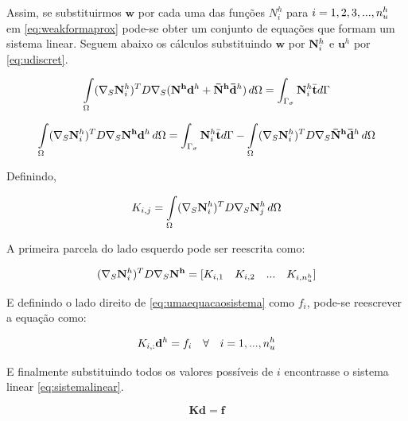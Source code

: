 Assim, se substituirmos $\mathbf{w}$ por cada uma das funções $N_i^h$ para $i = 1, 2, 3, ..., \freedomfine$ em \eqref{eq:weakformaprox} pode-se obter um conjunto de equações que formam um sistema linear. Seguem abaixo os cálculos substituindo $\mathbf{w}$ por $\basefunctionfine$ e $\mathbf{u}^h$ por \eqref{eq:udiscret}.


\begin{equation}
\omeint{ (\sopnabla \basefunctionfine)^T D \sopnabla (\mathbf{N^h} \mathbf{d}^h + \mathbf{\bar{N}^h} \mathbf{\bar{d}}^h )} = \int_{\Gamma_\sigma} \basefunctionfine \bar{\mathbf{t}} d\Gamma 
\end{equation}

\begin{equation}\label{eq:umaequacaosistema}
\omeint{ (\sopnabla \basefunctionfine)^T D \sopnabla \mathbf{N^h} \mathbf{d}^h }  = \int_{\Gamma_\sigma} \basefunctionfine \bar{\mathbf{t}}  d\Gamma - \omeint{ (\sopnabla \basefunctionfine)^T D \sopnabla  \mathbf{\bar{N}^h} \mathbf{\bar{d}}^h} 
\end{equation}

Definindo, 

\begin{equation}\label{eq:entradamatriz}
    K_{i,j} = \omeint{(\sopnabla \basefunctionfine)^T D \sopnabla \basefunctionfine[j]}
\end{equation}


A primeira parcela do lado esquerdo pode ser reescrita como:

\begin{equation}
     (\sopnabla \basefunctionfine)^T D \sopnabla \mathbf{N^h} = [K_{i,1}\quad  K_{i,2} \quad ... \quad K_{i,\freedomfine}] 
\end{equation}

E definindo o lado direito de \eqref{eq:umaequacaosistema} como $f_i$, pode-se reescrever a equação como:

\begin{equation} \label{eq:umaequacaosistemafim}
K_{i,:} \mathbf{d}^h = f_i \quad \forall \quad i=1,..., \freedomfine
\end{equation}

E finalmente substituindo todos os valores possíveis de $i$ encontrasse o sistema linear \eqref{eq:sistemalinear}.

\begin{equation}
    \mathbf{K} \mathbf{d} = \mathbf{f}
\end{equation}



